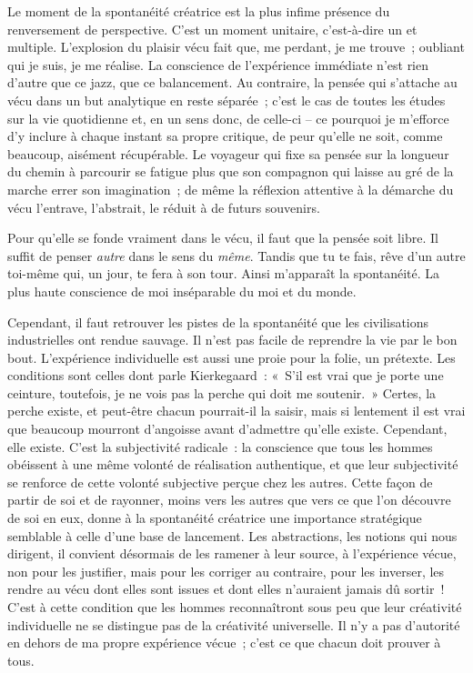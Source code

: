 \documentclass[french,twoside]{book} %
\begin{document}
\noindent Le moment de la spontanéité créatrice est la plus infime présence du renversement de perspective. C’est un moment unitaire, c’est-à-dire un et multiple. L’explosion du plaisir vécu fait que, me perdant, je me trouve ; oubliant qui je suis, je me réalise. La conscience de l’expérience immédiate n’est rien d’autre que ce jazz, que ce balancement. Au contraire, la pensée qui s’attache au vécu dans un but analytique en reste séparée ; c’est le cas de toutes les études sur la vie quotidienne et, en un sens donc, de celle-ci – ce pourquoi je m’efforce d’y inclure à chaque instant sa propre critique, de peur qu’elle ne soit, comme beaucoup, aisément récupérable. Le voyageur qui fixe sa pensée sur la longueur du chemin à parcourir se fatigue plus que son compagnon qui laisse au gré de la marche errer son imagination ; de même la réflexion attentive à la démarche du vécu l’entrave, l’abstrait, le réduit à de futurs souvenirs.\par
Pour qu’elle se fonde vraiment dans le vécu, il faut que la pensée soit libre. Il suffit de penser \emph{autre} dans le sens du \emph{même}. Tandis que tu te fais, rêve d’un autre toi-même qui, un jour, te fera à son tour. Ainsi m’apparaît la spontanéité. La plus haute conscience de moi inséparable du moi et du monde.\par
Cependant, il faut retrouver les pistes de la spontanéité que les civilisations industrielles ont rendue sauvage. Il n’est pas facile de reprendre la vie par le bon bout. L’expérience individuelle est aussi une proie pour la folie, un prétexte. Les conditions sont celles dont parle Kierkegaard : « S’il est vrai que je porte une ceinture, toutefois, je ne vois pas la perche qui doit me soutenir. » Certes, la perche existe, et peut-être chacun pourrait-il la saisir, mais si lentement il est vrai que beaucoup mourront d’angoisse avant d’admettre qu’elle existe. Cependant, elle existe. C’est la subjectivité radicale : la conscience que tous les hommes obéissent à une même volonté de réalisation authentique, et que leur subjectivité se renforce de cette volonté subjective perçue chez les autres. Cette façon de partir de soi et de rayonner, moins vers les autres que vers ce que l’on découvre de soi en eux, donne à la spontanéité créatrice une importance stratégique semblable à celle d’une base de lancement. Les abstractions, les notions qui nous dirigent, il convient désormais de les ramener à leur source, à l’expérience vécue, non pour les justifier, mais pour les corriger au contraire, pour les inverser, les rendre au vécu dont elles sont issues et dont elles n’auraient jamais dû sortir ! C’est à cette condition que les hommes reconnaîtront sous peu que leur créativité individuelle ne se distingue pas de la créativité universelle. Il n’y a pas d’autorité en dehors de ma propre expérience vécue ; c’est ce que chacun doit prouver à tous.
\end{document}
